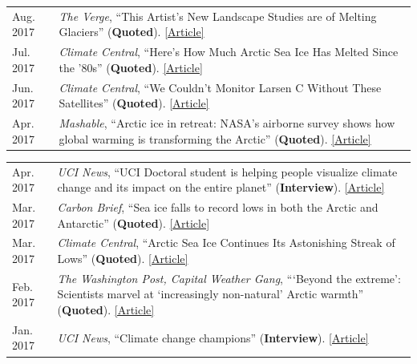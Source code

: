 \documentclass[margin,line,palatino,courier,10pt]{res}
\begin{document}
\begin{resume}
\begin{tabular}{@{}p{0.9in}p{4in}}
Aug. 2017 & \textit{The Verge}, ``This Artist's New Landscape Studies are of Melting Glaciers'' (\textbf{Quoted}). \href{http://sites.uci.edu/zlabe/media-and-outreach/?preview_id=567&preview_nonce=d7dd77fe7a&_thumbnail_id=-1&preview=true}{[Article]}\\
Jul. 2017 & \textit{Climate Central}, ``Here's How Much Arctic Sea Ice Has Melted Since the '80s'' (\textbf{Quoted}). \href{http://www.climatecentral.org/news/arctic-sea-ice-melt-since-the-80s-21637}{[Article]}\\
Jun. 2017 & \textit{Climate Central}, ``We Couldn't Monitor Larsen C Without These Satellites'' (\textbf{Quoted}). \href{http://www.climatecentral.org/news/larsen-c-monitoring-satellites-21564}{[Article]}\\
Apr. 2017 & \textit{Mashable}, ``Arctic ice in retreat: NASA's airborne survey shows how global warming is transforming the Arctic'' (\textbf{Quoted}). \href{http://mashable.com/2017/04/13/arctic-meltdown-nasa-photos-changing-ice/?utm_cid=hp-n-1#BgdepWyM6Pq3}{[Article]}\\
\end{tabular}
\begin{tabular}{@{}p{0.9in}p{4in}}
Apr. 2017 & \textit{UCI News}, ``UCI Doctoral student is helping people visualize climate change and its impact on the entire planet'' (\textbf{Interview}). \href{http://grad.uci.edu/news-and-events/student-spotlights/Zachary-Labe.html}{[Article]}\\
Mar. 2017 & \textit{Carbon Brief}, ``Sea ice falls to record lows in both the Arctic and Antarctic'' (\textbf{Quoted}). \href{https://www.carbonbrief.org/sea-ice-falls-record-lows-arctic-antarctic}{[Article]}\\
Mar. 2017 & \textit{Climate Central}, ``Arctic Sea Ice Continues Its Astonishing Streak of Lows'' (\textbf{Quoted}). \href{http://www.climatecentral.org/news/arctic-sea-ice-record-low-streak-21227}{[Article]}\\
Feb. 2017 & \textit{The Washington Post, Capital Weather Gang}, ```Beyond the extreme': Scientists marvel at `increasingly non-natural' Arctic warmth'' (\textbf{Quoted}). \href{https://www.washingtonpost.com/news/capital-weather-gang/wp/2017/02/01/beyond-the-extreme-scientists-marvel-at-increasingly-non-natural-arctic-warmth/?sdfsdfsdfsdfsd&utm_term=.cf3cf81d24f3}{[Article]}\\
Jan. 2017 & \textit{UCI News}, ``Climate change champions'' (\textbf{Interview}). \href{https://news.uci.edu/climate-change-champions/}{[Article]}\\

\end{tabular}
\end{resume}
\end{document}
